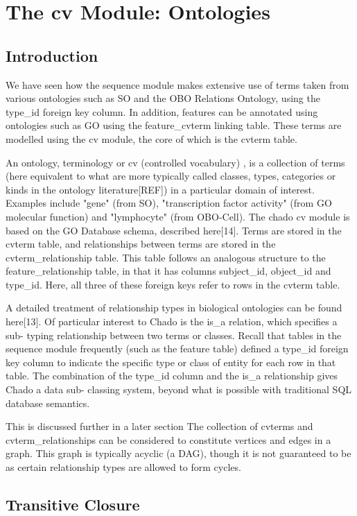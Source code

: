 \chapter{The cv Module: Ontologies}

\section{Introduction}

We have seen how the sequence module makes extensive use of terms
taken from various ontologies such as SO and the OBO Relations
Ontology, using the type\_id foreign key column. In addition, features
can be annotated using ontologies such as GO using the feature\_cvterm
linking table. These terms are modelled using the cv module, the core
of which is the cvterm table.

An ontology, terminology or cv (controlled vocabulary) , is a
collection of terms (here equivalent to what are more typically called
classes, types, categories or kinds in the ontology literature[REF])
in a particular domain of interest. Examples include "gene" (from SO),
"transcription factor activity" (from GO molecular function) and
"lymphocyte" (from OBO-Cell).  The chado cv module is based on the GO
Database schema, described here[14].  Terms are stored in the cvterm
table, and relationships between terms are stored in the
cvterm\_relationship table. This table follows an analogous structure
to the feature\_relationship table, in that it has columns subject\_id,
object\_id and type\_id. Here, all three of these foreign keys refer to
rows in the cvterm table.

A detailed treatment of relationship types in biological ontologies
can be found here[13]. Of particular interest to Chado is the is\_a
relation, which specifies a sub- typing relationship between two terms
or classes. Recall that tables in the sequence module frequently (such
as the feature table) defined a type\_id foreign key column to indicate
the specific type or class of entity for each row in that table. The
combination of the type\_id column and the is\_a relationship gives
Chado a data sub- classing system, beyond what is possible with
traditional SQL database semantics.

This is discussed further in a later section The collection of
cvterms and cvterm\_relationships can be considered to constitute
vertices and edges in a graph. This graph is typically acyclic (a
DAG), though it is not guaranteed to be as certain relationship types
are allowed to form cycles.

\section{Transitive Closure}


